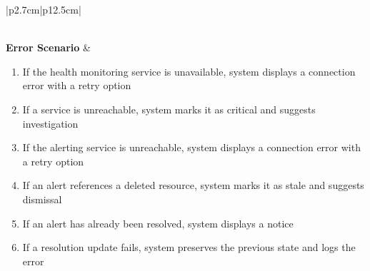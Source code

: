 \begin{table}[H]
\begin{tabular}{|p{2.7cm}|p{12.5cm}|}
\begin{minipage}[t]{\linewidth}
\begin{enumerate}[topsep=0pt,itemsep=1pt,parsep=0pt,partopsep=0pt]
            \end{enumerate}
        \end{minipage} \\
        \hline
        \textbf{Error Scenario} & \begin{minipage}[t]{\linewidth}
            \begin{enumerate}[topsep=0pt,itemsep=1pt,parsep=0pt,partopsep=0pt]
                \item If the health monitoring service is unavailable, system displays a connection error with a retry option
                \item If a service is unreachable, system marks it as critical and suggests investigation
                \item If the alerting service is unreachable, system displays a connection error with a retry option
                \item If an alert references a deleted resource, system marks it as stale and suggests dismissal
                \item If an alert has already been resolved, system displays a notice
                \item If a resolution update fails, system preserves the previous state and logs the error
            \end{enumerate}
        \end{minipage} \\
        \hline
    \end{tabular}
    \label{tab:admin-health-alerts}
\end{table}
